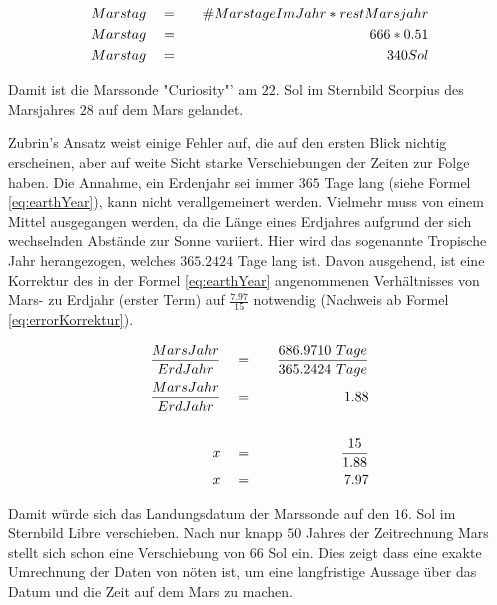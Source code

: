 \begin{eqnarray}
	Marstag \quad & = & \quad \#MarstageImJahr * restMarsjahr \\
	Marstag \quad & = & \quad 666 * 0.51 \notag\\
	Marstag \quad & = & \quad 340 Sol \notag
	\label{eq:MarsMonthSol}
\end{eqnarray}

Damit ist die Marssonde "Curiosity"' am $22.$ Sol im Sternbild Scorpius des 
Marsjahres $28$ auf dem Mars gelandet.

Zubrin's Ansatz weist einige Fehler auf, die auf den ersten Blick nichtig
erscheinen, aber auf weite Sicht starke Verschiebungen der Zeiten zur Folge
haben. Die Annahme, ein Erdenjahr sei immer $365$ Tage lang (siehe Formel
\ref{eq:earthYear}), kann nicht verallgemeinert werden. Vielmehr muss von einem
Mittel ausgegangen werden, da die L{\"a}nge eines Erdjahres aufgrund der sich
wechselnden Abst{\"a}nde zur Sonne variiert. Hier wird das sogenannte Tropische Jahr
herangezogen, welches $365.2424$ Tage lang ist. Davon ausgehend, ist eine
Korrektur des in der Formel \ref{eq:earthYear} angenommenen Verh{\"a}ltnisses von
Mars- zu Erdjahr (erster Term) auf $\frac{7.97}{15}$ notwendig (Nachweis ab
Formel \ref{eq:errorKorrektur}).

\begin{eqnarray}
	\frac{MarsJahr}{ErdJahr} \quad & = & \quad \frac{686.9710 \ Tage}{365.2424 \ Tage}
	\\
	\label{eq:errorKorrektur}  
	\frac{MarsJahr}{ErdJahr} \quad & = & \quad 1.88 \notag\\
	\notag\\
	x \quad & = & \quad \frac{15}{1.88} \notag\\
	x \quad & = & \quad 7.97 \notag
\end{eqnarray}

Damit w{\"u}rde sich das Landungsdatum der Marssonde auf den $16.$ Sol im Sternbild
Libre verschieben. Nach nur knapp $50$ Jahres der Zeitrechnung Mars stellt sich
schon eine Verschiebung von $66$ Sol ein. Dies zeigt dass eine exakte Umrechnung
der Daten von n{\"o}ten ist, um eine langfristige Aussage {\"u}ber das Datum und die
Zeit auf dem Mars zu machen.
